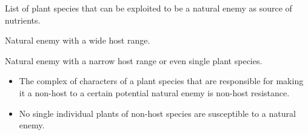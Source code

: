 \documentclass[11pt,dvipsnames,ignorenonframetext,aspectratio=169]{beamer}
\providecommand{\tightlist}{%
  \setlength{\itemsep}{0pt}\setlength{\parskip}{0pt}}
\begin{document}
\begin{frame}{}
\protect\hypertarget{section-12}{}
\begin{description}
\small
\item[Host range] List of plant species that can be exploited to be a natural enemy as source of nutrients.
\item[Generalists/polyphagous] Natural enemy with a wide host range.
\item[Specialits/oligophagous/monophagous] Natural enemy with a narrow host range or even single plant species.
\end{description}

\begin{itemize}
\tightlist
\item
  The complex of characters of a plant species that are responsible for
  making it a non-host to a certain potential natural enemy is non-host
  resistance.
\item
  No single individual plants of non-host species are susceptible to a
  natural enemy.
\end{itemize}
\end{frame}
\end{document}

